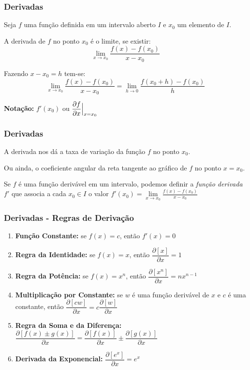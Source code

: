 \documentclass[hyperref={pdfpagelabels=false}]{beamer}
\begin{document}
\begin{frame}
\frametitle{Derivadas}
\begin{definition}
	Seja $f$ uma função definida em um intervalo aberto $I$ e $x_0$ um elemento de $I$.
	
	A derivada de $f$ no ponto $x_0$ é o limite, se existir:
	\begin{equation}
	\lim\limits_{x \rightarrow x_0}\frac{f(x) - f(x_0)}{x-x_0}
	\end{equation}
	
	Fazendo $x-x_0=h$ tem-se:
	\begin{equation}
	\lim\limits_{x \rightarrow x_0}\frac{f(x) - f(x_0)}{x-x_0} = \lim\limits_{h \rightarrow 0}\frac{f(x_0 + h)-f(x_0)}{h}
	\end{equation}	
	
	{\bf Notação:} $f'(x_0)$ ou $\dfrac{\partial f}{\partial x} \Big{|}_{x=x_0}$
\end{definition}
\pause

\end{frame}

\begin{frame}
\frametitle{Derivadas}
A derivada nos dá a taxa de variação da função $f$ no ponto $x_0$.

Ou ainda, o coeficiente angular da reta tangente ao gráfico de $f$ no ponto $x=x_0$.
\pause

Se $f$ é uma função derivável em um intervalo, podemos definir a \emph{função derivada} $f'$ que associa a cada $x_0 \in I$ o valor $f'(x_0) = \lim\limits_{x \rightarrow x_0}\frac{f(x) - f(x_0)}{x-x_0}$

\end{frame}

\begin{frame}
\frametitle{Derivadas - Regras de Derivação}

\begin{enumerate}
	\item {\bf Função Constante:} se $f(x) = c$, então $f'(x) = 0$ \pause

	\item {\bf Regra da Identidade:} se $f(x) = x$, então $\dfrac{\partial [x]}{\partial x} = 1$ \pause
	
	\item {\bf Regra da Potência:} se $f(x) = x^n$, então $\dfrac{\partial [x^n]}{\partial x} = nx^{n-1}$ \pause

	\item {\bf  Multiplicação por Constante:} se $w$ é uma função derivável de $x$ e $c$ é uma constante, então $\dfrac{\partial [cw]}{\partial x} = c \dfrac{\partial [w]}{\partial x}$ \pause
    
    \item {\bf Regra da Soma e da Diferença:} $\dfrac{\partial [f(x) \pm g(x)]}{\partial x} = \dfrac{\partial [f(x)]}{\partial x} \pm \dfrac{\partial [g(x)]}{\partial x}$ \pause
    
    \item {\bf Derivada da Exponencial:} $\dfrac{\partial [e^x]}{\partial x} = e^x$ 
    \end{enumerate}
\end{frame}
\end{document}
